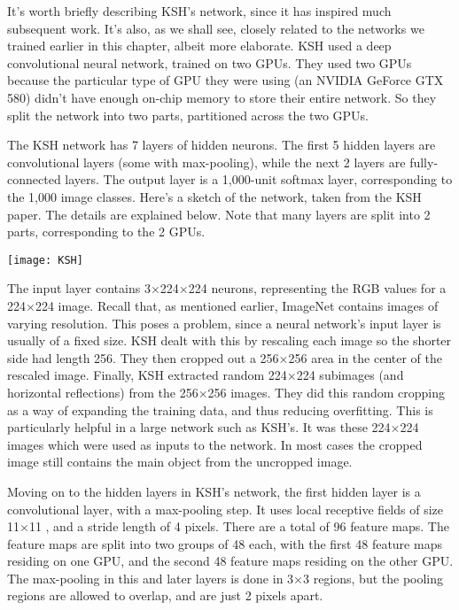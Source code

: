 It's worth briefly describing KSH's network, since it has inspired much subsequent work. It's also, as we shall see, closely related to the networks we trained earlier in this chapter, albeit more elaborate. KSH used a deep convolutional neural network, trained on two GPUs. They used two GPUs because the particular type of GPU they were using (an NVIDIA GeForce GTX 580) didn't have enough on-chip memory to store their entire network. So they split the network into two parts, partitioned across the two GPUs.

The KSH network has 7 layers of hidden neurons. The first 5 hidden layers are convolutional layers (some with max-pooling), while the next 2 layers are fully-connected layers. The output layer is a 1,000-unit softmax layer, corresponding to the 1,000 image classes. Here's a sketch of the network, taken from the KSH paper. The details are explained below. Note that many layers are split into 2 parts, corresponding to the 2 GPUs.

\begin{figure*}[tph]
\texttt{[image: KSH]}
\end{figure*}

The input layer contains 3$\times$224$\times$224 neurons, representing the RGB values for a 224$\times$224 image. Recall that, as mentioned earlier, ImageNet contains images of varying resolution. This poses a problem, since a neural network's input layer is usually of a fixed size. KSH dealt with this by rescaling each image so the shorter side had length 256. They then cropped out a 256$\times$256 area in the center of the rescaled image. Finally, KSH extracted random 224$\times$224 subimages (and horizontal reflections) from the 256$\times$256 images. They did this random cropping as a way of expanding the training data, and thus reducing overfitting. This is particularly helpful in a large network such as KSH's. It was these 224$\times$224 images which were used as inputs to the network. In most cases the cropped image still contains the main object from the uncropped image.

Moving on to the hidden layers in KSH's network, the first hidden layer is a convolutional layer, with a max-pooling step. It uses local receptive fields of size 11$\times$11 , and a stride length of 4 pixels. There are a total of 96 feature maps. The feature maps are split into two groups of 48 each, with the first 48 feature maps residing on one GPU, and the second 48 feature maps residing on the other GPU. The max-pooling in this and later layers is done in 3$\times$3 regions, but the pooling regions are allowed to overlap, and are just 2 pixels apart.

